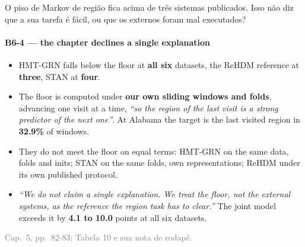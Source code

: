 \documentclass{beamer}
\begin{document}
\begin{frame}[noframenumbering]{O piso de Markov de região fica acima de três sistemas publicados. Isso não diz que a sua tarefa é fácil, ou que os externos foram mal executados?}
    \framesubtitle{B6-4 --- the chapter declines a single explanation}
    \hypertarget{b64}{}
    \small\begin{itemize}\setlength{\itemsep}{0pt}\setlength{\parskip}{0pt}
        \item HMT-GRN falls below the floor at \textbf{all six} datasets, the ReHDM reference at \textbf{three}, STAN at \textbf{four}.
        \item The floor is computed under \textbf{our own sliding windows and folds}, advancing one visit at a time, \textit{``so the region of the last visit is a strong predictor of the next one''}. At Alabama the target is the last visited region in \textbf{32.9\%} of windows.
        \item They do not meet the floor on equal terms: HMT-GRN on the same data, folds and inits; STAN on the same folds, own representations; ReHDM under its own published protocol.
        \item \textit{``We do not claim a single explanation. We treat the floor, not the external systems, as the reference the region task has to clear.''} The joint model exceeds it by \textbf{4.1 to 10.0} points at all six datasets.
    \end{itemize}
    \vfill
    {\scriptsize
    \begin{minipage}[b]{0.775\linewidth}\raggedright\textcolor{gray}{Cap.~5, pp.~82-83; Tabela 10 e sua nota de rodapé.}\end{minipage}\hfill
    \begin{minipage}[b]{0.20\linewidth}\raggedleft \hyperlink{b0}{}\end{minipage}}
\end{frame}
\end{document}
